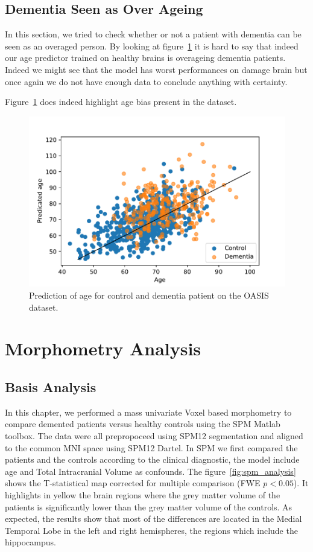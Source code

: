 \section{Dementia Seen as Over Ageing}
In this section, we tried to check whether or not a patient with dementia can be seen as an overaged person. By looking at figure~\ref{fig:dem_vs_control_age_pred} it is hard to say that indeed our age predictor trained on healthy brains is overageing dementia patients. Indeed we might see that the model has worst performances on damage brain but once again we do not have enough data to conclude anything with certainty. 

Figure~\ref{fig:dem_vs_control_age_pred} does indeed highlight age bias present in the dataset. 
\begin{figure}
 \centering
 \includegraphics[width=.9\linewidth]{figures/Experiements/dem_vs_cont_age_pred.pdf}
 \captionsetup{width=.9\linewidth}
 \caption{Prediction of age for control and dementia patient on the OASIS dataset.}
 \label{fig:dem_vs_control_age_pred}
\end{figure}


\chapter{Morphometry Analysis}
\label{chap:Morphometry_analysis}

\section{Basis Analysis}
In this chapter, we performed a mass univariate Voxel based morphometry to compare demented patients versus healthy controls using the SPM Matlab toolbox. The data were all prepropoceed using SPM12 segmentation and aligned to the common MNI space using SPM12 Dartel. In SPM we first compared the patients and the controls according to the clinical diagnostic, the model include age and Total Intracranial Volume as confounds. The figure~\ref{fig:spm_analysis} shows the T-statistical map corrected for multiple comparison (FWE $p < 0.05$). It highlights in yellow the brain regions where the grey matter volume of the patients is significantly lower than the grey matter volume of the controls. As expected, the results show that most of the differences are located in the Medial Temporal Lobe in the left and right hemispheres, the regions which include the hippocampus.

